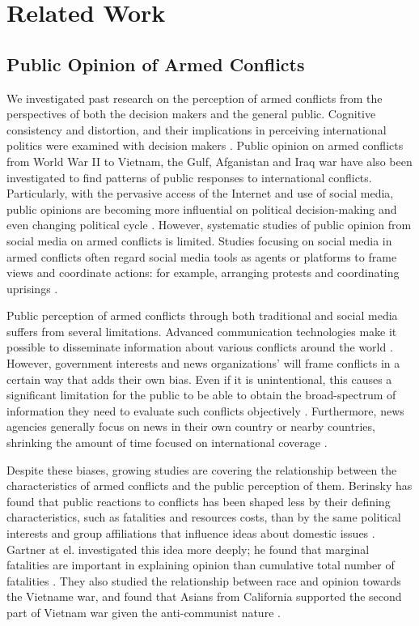 \section{Related Work}
\subsection{Public Opinion of Armed Conflicts}
We investigated past research on the perception of armed conflicts from the perspectives of both the decision makers and the general public. Cognitive consistency and distortion, and their implications in perceiving international politics were examined with decision makers \cite{Jervis1976}. Public opinion on armed conflicts from World War II to Vietnam, the Gulf, Afganistan and Iraq war have also been investigated to find patterns of public responses to international conflicts. Particularly, with the pervasive access of the Internet and use of social media, public opinions are becoming more influential on political decision-making and even changing political cycle \cite{Shirky2011}. However, systematic studies of public opinion from social media on armed conflicts is limited. Studies focusing on social media in armed conflicts often regard social media tools as agents or platforms to frame views and coordinate actions: for example, arranging protests and coordinating uprisings \cite{Lim2012}.

Public perception of armed conflicts through both traditional and social media suffers from several limitations. Advanced communication technologies make it possible to disseminate information about various conflicts around the world \cite{Sacco2015}. However, government interests and news organizations' will frame conflicts in a certain way that adds their own bias. Even if it is unintentional, this causes a significant limitation for the public to be able to obtain the broad-spectrum of information they need to evaluate such conflicts objectively \cite{Nelson1997}. Furthermore, news agencies generally focus on news in their own country or nearby countries, shrinking the amount of time focused on international coverage \cite{Seib2004}. 

Despite these biases, growing studies are covering the relationship between the characteristics of armed conflicts and the public perception of them. Berinsky has found that public reactions to conflicts has been shaped less by their defining characteristics, such as fatalities and resources costs, than by the same political interests and group affiliations that influence ideas about domestic issues \cite{Berinsky2009}. Gartner at el. investigated this idea more deeply; he found that marginal fatalities are important in explaining opinion than cumulative total number of fatalities \cite{Gartner1998}. They also studied the relationship between race and opinion towards the Vietname war, and found that Asians from California supported the second part of Vietnam war given the anti-communist nature \cite{Gartner2000}. 

